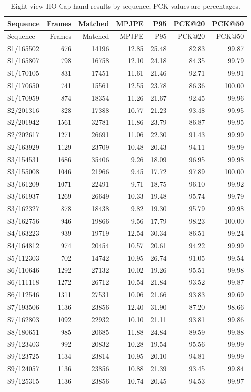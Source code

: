 \begin{longtable}{lrrrrrr}
\caption{Eight-view HO-Cap hand results by sequence; PCK values are percentages.}\label{tab:hocap-hand-detail}\\
\toprule Sequence & Frames & Matched & MPJPE & P95 & PCK@20 & PCK@50 \\
\midrule\endfirsthead
\toprule Sequence & Frames & Matched & MPJPE & P95 & PCK@20 & PCK@50 \\
\midrule\endhead
S1/165502 & 676 & 14196 & 12.85 & 25.48 & 82.83 & 99.87 \\
S1/165807 & 798 & 16758 & 12.10 & 24.18 & 84.35 & 99.79 \\
S1/170105 & 831 & 17451 & 11.61 & 21.46 & 92.71 & 99.91 \\
S1/170650 & 741 & 15561 & 12.55 & 23.78 & 86.36 & 100.00 \\
S1/170959 & 874 & 18354 & 11.26 & 21.67 & 92.45 & 99.96 \\
S2/201316 & 828 & 17388 & 10.77 & 21.23 & 93.48 & 99.95 \\
S2/201942 & 1561 & 32781 & 11.86 & 23.79 & 86.87 & 99.95 \\
S2/202617 & 1271 & 26691 & 11.06 & 22.30 & 91.43 & 99.99 \\
S2/163929 & 1129 & 23709 & 10.48 & 20.43 & 94.11 & 99.99 \\
S3/154531 & 1686 & 35406 & 9.26 & 18.09 & 96.95 & 99.98 \\
S3/155008 & 1046 & 21966 & 9.45 & 17.72 & 97.89 & 100.00 \\
S3/161209 & 1071 & 22491 & 9.71 & 18.75 & 96.10 & 99.92 \\
S3/161937 & 1269 & 26649 & 10.33 & 19.48 & 95.74 & 99.79 \\
S3/162327 & 878 & 18438 & 9.82 & 19.30 & 95.79 & 99.98 \\
S3/162756 & 946 & 19866 & 9.56 & 17.79 & 98.23 & 100.00 \\
S4/163223 & 939 & 19719 & 12.54 & 30.34 & 86.51 & 99.24 \\
S4/164812 & 974 & 20454 & 10.57 & 20.61 & 94.22 & 99.99 \\
S5/112303 & 702 & 14742 & 10.95 & 26.74 & 91.05 & 99.54 \\
S6/110646 & 1292 & 27132 & 10.02 & 19.26 & 95.51 & 99.98 \\
S6/111118 & 1272 & 26712 & 10.54 & 21.84 & 93.52 & 99.87 \\
S6/112546 & 1311 & 27531 & 10.06 & 21.66 & 93.83 & 99.69 \\
S7/193506 & 1136 & 23856 & 12.40 & 31.90 & 87.20 & 98.66 \\
S7/162803 & 1092 & 22932 & 10.10 & 21.11 & 93.81 & 99.86 \\
S8/180651 & 985 & 20685 & 11.88 & 24.84 & 89.59 & 99.88 \\
S9/123403 & 992 & 20832 & 10.28 & 19.54 & 95.56 & 99.99 \\
S9/123725 & 1134 & 23814 & 10.95 & 20.10 & 94.81 & 99.99 \\
S9/124057 & 1136 & 23856 & 10.88 & 21.39 & 93.45 & 99.84 \\
S9/125315 & 1136 & 23856 & 10.74 & 20.45 & 94.53 & 99.97 \\
\bottomrule
\end{longtable}

